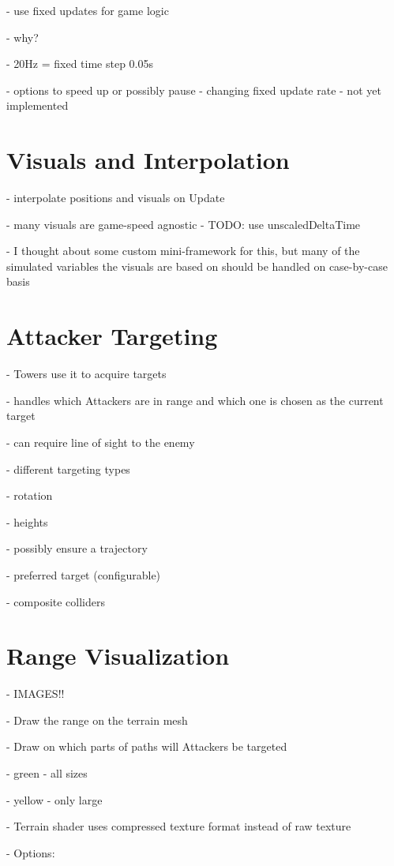 - use fixed updates for game logic

- why?

- 20Hz = fixed time step 0.05s

- options to speed up or possibly pause - changing fixed update rate - not yet implemented

\section{Visuals and Interpolation}

- interpolate positions and visuals on Update

- many visuals are game-speed agnostic     - TODO: use unscaledDeltaTime

- I thought about some custom mini-framework for this, but many of the simulated variables the visuals are based on should be handled on case-by-case basis

\section{Attacker Targeting}

- Towers use it to acquire targets

- handles which Attackers are in range and which one is chosen as the current target

- can require line of sight to the enemy

- different targeting types

- rotation

- heights

- possibly ensure a trajectory

- preferred target (configurable)

- composite colliders

\section{Range Visualization}

- IMAGES!!

- Draw the range on the terrain mesh

- Draw on which parts of paths will Attackers be targeted

- green - all sizes

- yellow - only large

- Terrain shader uses compressed texture format instead of raw texture

- Options:


